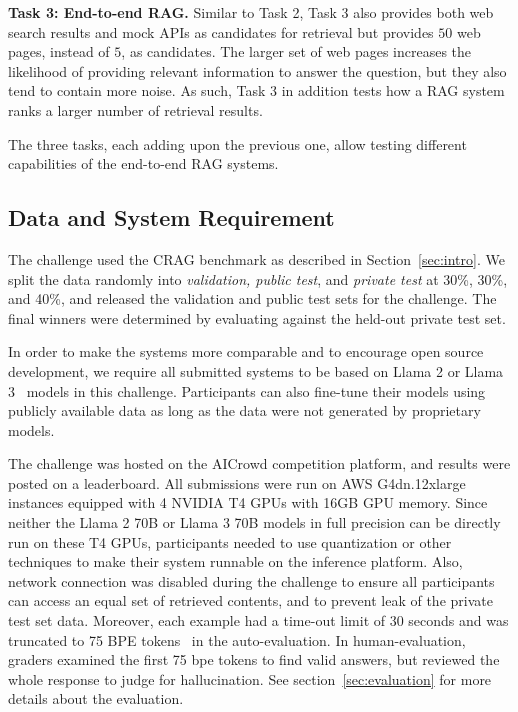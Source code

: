 \noindent
\textbf{Task 3: End-to-end RAG.} Similar to Task 2, Task 3 also provides both web search results and mock APIs as candidates for retrieval but provides $50$ web pages, instead of $5$, as candidates. The larger set of web pages increases the likelihood of providing relevant information to answer the question, but they also tend to contain more noise. As such, Task 3 in addition tests how a RAG system ranks a larger number of retrieval results. 

The three tasks, each adding upon the previous one, allow testing different capabilities of the end-to-end RAG systems. 

\subsection{Data and System Requirement}
The challenge used the CRAG benchmark as described in Section~\ref{sec:intro}. We split the data randomly into {\em validation, public test}, and {\em private test} at 30\%, 30\%, and 40\%, and released the validation and public test sets for the challenge. The final winners were determined by evaluating against the held-out private test set. 

In order to make the systems more comparable and to encourage open source development, we require all submitted systems to be based on Llama 2 \cite{touvron2023llama} or Llama 3~\cite{llama3modelcard} models in this challenge. Participants can also fine-tune their models using publicly available data as long as the data were not generated by proprietary models.

The challenge was hosted on the AICrowd competition platform, and results were posted on a leaderboard. All submissions were run on AWS G4dn.12xlarge instances equipped with 4 NVIDIA T4 GPUs with 16GB GPU memory. Since neither the Llama 2 70B or Llama 3 70B models in full precision can be directly run on these T4 GPUs, participants needed to use quantization or other techniques to make their system runnable on the inference platform. Also, network connection was disabled during the challenge to ensure all participants can access an equal set of retrieved contents, and to prevent leak of the private test set data. Moreover, each example had a time-out limit of 30 seconds and was truncated to 75 BPE tokens~\cite{sennrich-etal-2016-neural} in the auto-evaluation. In human-evaluation, graders examined the first 75 bpe tokens to find valid answers, but reviewed the whole response to judge for hallucination. See section~\ref{sec:evaluation} for more details about the evaluation.


